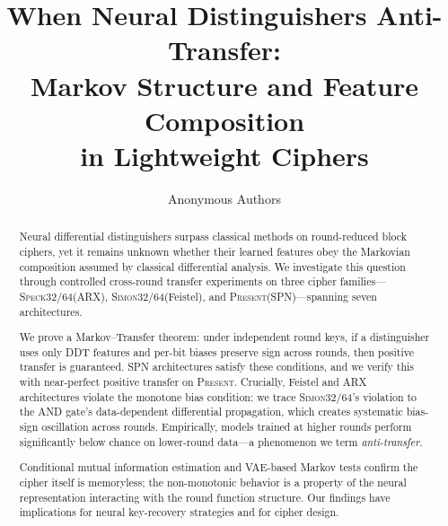 \documentclass[runningheads]{llncs}
\newcommand{\speck}{\textsc{Speck32/64}}
\newcommand{\simon}{\textsc{Simon32/64}}
\newcommand{\present}{\textsc{Present}}
\begin{document}
\title{When Neural Distinguishers Anti-Transfer:\\Markov Structure and Feature Composition\\in Lightweight Ciphers}

\author{Anonymous Authors}


\maketitle


\begin{abstract}
Neural differential distinguishers surpass classical methods on round-reduced block ciphers, yet it remains unknown whether their learned features obey the Markovian composition assumed by classical differential analysis.
We investigate this question through controlled cross-round transfer experiments on three cipher families---\speck (ARX), \simon (Feistel), and \present (SPN)---spanning seven architectures.

We prove a Markov--Transfer theorem: under independent round keys, if a distinguisher uses only DDT features and per-bit biases preserve sign across rounds, then positive transfer is guaranteed.
SPN architectures satisfy these conditions, and we verify this with near-perfect positive transfer on \present.
Crucially, Feistel and ARX architectures violate the monotone bias condition: we trace \simon's violation to the AND gate's data-dependent differential propagation, which creates systematic bias-sign oscillation across rounds.
Empirically, models trained at higher rounds perform significantly below chance on lower-round data---a phenomenon we term \emph{anti-transfer}.

Conditional mutual information estimation and VAE-based Markov tests confirm the cipher itself is memoryless; the non-monotonic behavior is a property of the neural representation interacting with the round function structure.
Our findings have implications for neural key-recovery strategies and for cipher design.

\end{abstract}
\end{document}
